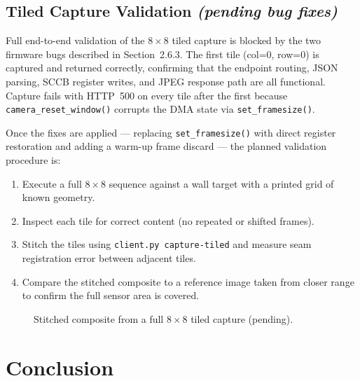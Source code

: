 \documentclass[12pt]{article}
\begin{document}
\subsection{Tiled Capture Validation \textnormal{\textit{(pending bug fixes)}}}

Full end-to-end validation of the $8 \times 8$ tiled capture is blocked by the
two firmware bugs described in Section~2.6.3.  The first tile (col=0, row=0) is
captured and returned correctly, confirming that the endpoint routing, JSON
parsing, SCCB register writes, and JPEG response path are all functional.
Capture fails with HTTP~500 on every tile after the first because
\texttt{camera\_reset\_window()} corrupts the DMA state via \texttt{set\_framesize()}.

Once the fixes are applied --- replacing \texttt{set\_framesize()} with direct
register restoration and adding a warm-up frame discard --- the planned
validation procedure is:

\begin{enumerate}
  \item Execute a full $8 \times 8$ sequence against a wall target with a
        printed grid of known geometry.
  \item Inspect each tile for correct content (no repeated or shifted frames).
  \item Stitch the tiles using \texttt{client.py capture-tiled} and measure
        seam registration error between adjacent tiles.
  \item Compare the stitched composite to a reference image taken from closer
        range to confirm the full sensor area is covered.
\end{enumerate}

\begin{figure}[H]
  \centering
  \caption{Stitched composite from a full $8\times 8$ tiled capture (pending).}
  \label{fig:stitched}
\end{figure}

\section{Conclusion}
\end{document}

